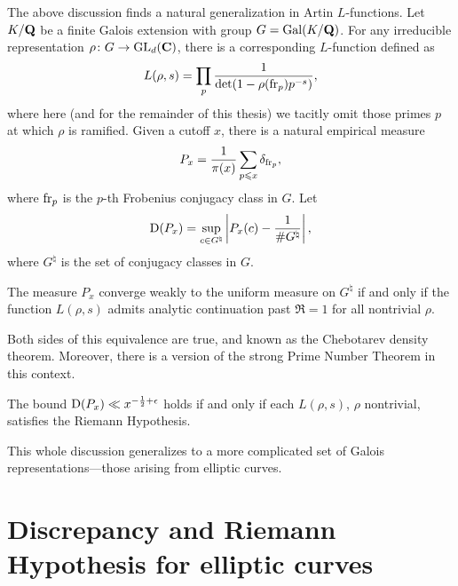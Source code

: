 The above discussion finds a natural generalization in Artin $L$-functions. 
Let $K/\mathbf{Q}$ be a finite Galois extension with group $G=\operatorname{Gal}(K/\mathbf{Q})$. For any 
irreducible representation $\rho\colon G\to \operatorname{GL}_d(\mathbf{C})$, there is a 
corresponding $L$-function defined as 
\[
	L(\rho,s) = \prod_p \frac{1}{\det(1-\rho(\mathrm{fr}_p) p^{-s})} ,
\]
where here (and for the remainder of this thesis) we tacitly omit those primes 
$p$ at which $\rho$ is ramified. Given a cutoff $x$, there is a natural 
empirical measure 
\[
	P_x = \frac{1}{\pi(x)} \sum_{p\leqslant x} \delta_{\mathrm{fr}_p} ,
\]
where $\mathrm{fr}_p$ is the $p$-th Frobenius conjugacy class in $G$. Let 
\[
	\operatorname{D}(P_x) = \sup_{c\in G^\natural} \left| P_x(c) - \frac{1}{\# G^\natural}\right|,
\]
where $G^\natural$ is the set of conjugacy classes in $G$. 

\begin{theorem}
The measure $P_x$ converge weakly to the uniform measure on $G^\natural$ if and 
only if the function $L(\rho,s)$ admits analytic continuation past $\Re =1$ for 
all nontrivial $\rho$. 
\end{theorem}

Both sides of this equivalence are true, and known as the Chebotarev density 
theorem. Moreover, there is a version of the strong Prime Number Theorem in 
this context. 

\begin{theorem}
The bound $\operatorname{D}(P_x) \ll x^{-\frac 1 2+\epsilon}$ holds if and only if each
$L(\rho,s)$, $\rho$ nontrivial, satisfies the Riemann Hypothesis. 
\end{theorem}

This whole discussion generalizes to a more complicated set of Galois 
representations---those arising from elliptic curves. 





\section{Discrepancy and Riemann Hypothesis for elliptic curves}

